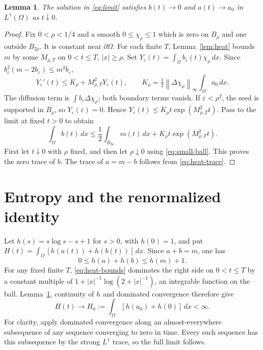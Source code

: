 \documentclass[11pt]{article}
\newtheorem{lemma}[theorem]{Lemma}
\theoremstyle{definition}
\newcommand{\Om}{\Omega}
\newcommand{\dd}{\,dx}
\newcommand{\norm}[1]{\left\lVert#1\right\rVert}
\begin{document}
\begin{lemma}\label{lem:trace}
The solution in \eqref{eq:limit} satisfies
$b(t)\to0$ and $a(t)\to a_0$ in $L^1(\Om)$ as $t\downarrow0$.
\end{lemma}
\begin{proof}
Fix $0<\rho<1/4$ and a smooth $0\le\chi_\rho\le1$ which is zero on
$B_\rho$ and one outside $B_{2\rho}$. It is constant near $\partial\Om$.
For each finite $T$, Lemma~\ref{lem:heat} bounds $m$ by some
$M_{\rho,T}$ on $0<t\le T$, $|x|\ge\rho$. Set
$Y_\varepsilon(t)=\int_\Om b_\varepsilon(t)\chi_\rho\dd$.
Since $b_\varepsilon^2(m-2b_\varepsilon)\le m^2b_\varepsilon$,
\[
 Y_\varepsilon'(t)\le K_\rho+M_{\rho,T}^2Y_\varepsilon(t),\qquad
 K_\rho=\tfrac12\norm{\Delta\chi_\rho}_\infty\int_\Om a_0\dd.
\]
The diffusion term is $\int b_\varepsilon\Delta\chi_\rho$; both boundary
terms vanish. If $\varepsilon<\rho^2$, the seed is supported in $B_\rho$,
so $Y_\varepsilon(\varepsilon)=0$. Hence
$Y_\varepsilon(t)\le K_\rho t\exp(M_{\rho,T}^2t)$.
Pass to the limit at fixed $t>0$ to obtain
\[
 \int_\Om b(t)\dd\le\frac12\int_{B_{2\rho}}m(t)\dd
                    +K_\rho t\exp(M_{\rho,T}^2t).
\]
First let $t\downarrow0$ with $\rho$ fixed, and then let $\rho\downarrow0$
using \eqref{eq:small-ball}. This proves the zero trace of $b$. The trace
of $a=m-b$ follows from \eqref{eq:heat-trace}.
\end{proof}

\section{Entropy and the renormalized identity}

Let $h(s)=s\log s-s+1$ for $s>0$, with $h(0)=1$, and put
$H(t)=\int_\Om[h(a(t))+h(b(t))]\dd$.
Since $a+b=m$, one has
\begin{equation}\label{eq:entropy-upper}
 0\le h(a)+h(b)\le h(m)+1.
\end{equation}
For any fixed finite $T$, \eqref{eq:heat-bounds} dominates the right side
on $0<t\le T$ by a constant multiple of
$1+|x|^{-1}\log(2+|x|^{-1})$, an integrable function on the ball.
Lemma~\ref{lem:trace}, continuity of $h$ and dominated convergence therefore
give
\begin{equation}\label{eq:entropy-trace}
 H(t)\longrightarrow H_0:=\int_\Om[h(a_0)+h(0)]\dd<\infty.
\end{equation}
For clarity, apply dominated convergence along an almost-everywhere
subsequence of any sequence converging to zero in time. Every such sequence
has this subsequence by the strong $L^1$ trace, so the full limit follows.
\end{document}

